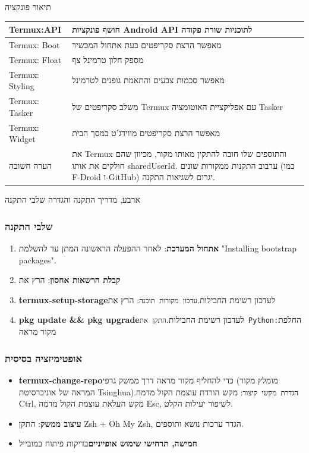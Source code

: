 
תיאור פונקציה

\begin{center}
\begin{tabularx}{\linewidth}{|X|X|}
\hline
\textbf{Termux:API} & \textbf{חושף פונקציות Android API לתוכניות שורת פקודה} \tabularnewline
\hline
Termux: Boot & מאפשר הרצת סקריפטים בעת אתחול המכשיר \tabularnewline
Termux: Float & מספק חלון טרמינל צף \tabularnewline
Termux: Styling & מאפשר סכמות צבעים והתאמת גופנים לטרמינל \tabularnewline
Termux: Tasker & משלב סקריפטים של Termux עם אפליקציית האוטומציה Tasker \tabularnewline
Termux: Widget & מאפשר הרצת סקריפטים מווידג'ט במסך הבית \tabularnewline
הערה חשובה & את Termux והתוספים שלו חובה להתקין מאותו מקור, מכיוון שהם חולקים את אותו sharedUserId. ערבוב התקנות ממקורות שונים (כמו F-Droid ו-GitHub) יגרום לשגיאות התקנה. \tabularnewline
\hline
\end{tabularx}
\end{center}

\begin{tcbwarn}{ארבע, מדריך התקנה והגדרה}
שלבי התקנה

\end{tcbwarn}


\subsubsection*{שלבי התקנה}

\begin{enumerate}
  \item \textbf{אתחול המערכת}: לאחר ההפעלה הראשונה המתן עד להשלמת "Installing bootstrap packages".
  \item \textbf{קבלת הרשאות אחסון}: הרץ את
  \item \textbf{termux-setup-storage}לעדכון רשימת החבילות.\texttt{עדכון מקורות תוכנה}: הרץ את
  \item \textbf{pkg update \&\& pkg upgrade}לעדכון רשימת החבילות.\texttt{התקן את Python:}החלפת מקור מראה
\end{enumerate}

\subsubsection*{אופטימיזציה בסיסית}

\begin{itemize}
  \item \textbf{termux-change-repo}כדי להחליף מקור מראה דרך ממשק גרפי (מומלץ מקור המראה של אוניברסיטת Tsinghua).\texttt{הגדרת מקשי קיצור}: מקש הורדת עוצמת הקול מדמה Ctrl, מקש העלאת עוצמת הקול מדמה Esc, לשיפור יעילות הקלט.
  \item \textbf{עיצוב ממשק}: התקן Zsh + Oh My Zsh, הגדר ערכות נושא ותוספים.
  \item \textbf{חמישה, תרחישי שימוש אופייניים}בדיקות פיתוח במובייל
\end{itemize}

